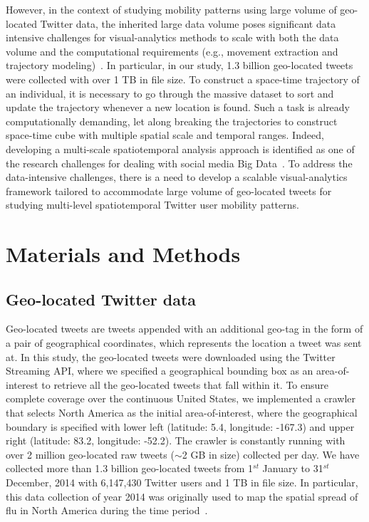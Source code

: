 \documentclass[ijgi,article,submit,moreauthors,pdftex,10pt,a4paper]{mdpi}
\theoremstyle{mdpi}
\newcounter{ex}
\newcounter{re}
\theoremstyle{mdpidefinition}
\begin{document}
However, in the context of studying mobility patterns using large volume of geo-located Twitter data, the inherited large data volume poses significant data intensive challenges for visual-analytics methods to scale with both the data volume and the computational requirements (e.g., movement extraction and trajectory modeling)~\cite{cao2014scalable}.
In particular, in our study, 1.3 billion geo-located tweets were collected with over 1 TB in file size.
To construct a space-time trajectory of an individual, it is necessary to go through the massive dataset to sort and update the trajectory whenever a new location is found.
Such a task is already computationally demanding, let along breaking the trajectories to construct space-time cube with multiple spatial scale and temporal ranges.
Indeed, developing a multi-scale spatiotemporal analysis approach is identified as one of the research challenges for dealing with social media Big Data~\cite{tsou2015}.
To address the data-intensive challenges, there is a need to develop a scalable visual-analytics framework tailored to accommodate large volume of geo-located tweets for studying multi-level spatiotemporal Twitter user mobility patterns.

\section{Materials and Methods}
\subsection{Geo-located Twitter data}
Geo-located tweets are tweets appended with an additional geo-tag in the form of a pair of geographical coordinates, which represents the location a tweet was sent at.
In this study, the geo-located tweets were downloaded using the Twitter Streaming API, where we specified a geographical bounding box as an area-of-interest to retrieve all the geo-located tweets that fall within it.
To ensure complete coverage over the continuous United States, we implemented a crawler that selects North America as the initial area-of-interest, where the geographical boundary is specified with lower left (latitude: 5.4, longitude: -167.3) and upper right (latitude: 83.2, longitude: -52.2).
The crawler is constantly running with over 2 million geo-located raw tweets ($\sim$2 GB in size) collected per day.
We have collected more than 1.3 billion geo-located tweets from 1$^{st}$ January to 31$^{st}$ December, 2014 with 6,147,430 Twitter users and 1 TB in file size.
In particular, this data collection of year 2014 was originally used to map the spatial spread of flu in North America during the time period~\cite{padmanabhan2014flumapper}.
\end{document}
